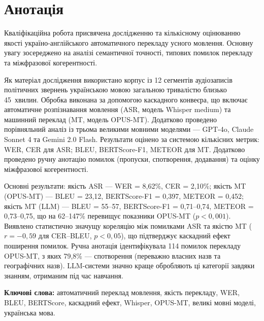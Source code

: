 \setcounter{secnumdepth}{0}
\section{\centering Анотація}

Кваліфікаційна робота присвячена дослідженню та кількісному оцінюванню якості
україно-англійського автоматичного перекладу усного мовлення. Основну увагу
зосереджено на аналізі семантичної точності, типових помилок перекладу та
міжфразової когерентності.

Як матеріал дослідження використано корпус із 12 сегментів аудіозаписів
політичних звернень українською мовою загальною тривалістю близько 45~хвилин.
Обробка виконана за допомогою каскадного конвеєра, що включає автоматичне
розпізнавання мовлення (ASR, модель Whisper medium) та машинний переклад
(MT, модель OPUS-MT). Додатково проведено порівняльний аналіз із трьома
великими мовними моделями --- GPT-4o, Claude Sonnet 4 та Gemini 2.0 Flash.
Результати оцінено за системою кількісних метрик: WER, CER для ASR; BLEU,
BERTScore-F1, METEOR для MT. Додатково проведено ручну анотацію помилок
(пропуски, спотворення, додавання) та оцінку міжфразової когерентності.

Основні результати: якість ASR --- WER = 8,62\%, CER = 2,10\%; якість MT
(OPUS-MT) --- BLEU = 23,12, BERTScore-F1 = 0,397, METEOR = 0,452; якість MT
(LLM) --- BLEU = 55--57, BERTScore-F1 = 0,71--0,74, METEOR = 0,73--0,75, що
на 62--147\% перевищує показники OPUS-MT ($p < 0,001$). Виявлено статистично
значущу кореляцію між помилками ASR та якістю MT ($r = -0,59$ для CER--BLEU,
$p < 0,05$), що підтверджує каскадний ефект поширення помилок. Ручна анотація
ідентифікувала 114 помилок перекладу OPUS-MT, з яких 79,8\% --- спотворення
(переважно власних назв та географічних назв). LLM-системи значно краще обробляють ці категорії завдяки знанням,
отриманим під час навчання.

\textbf{Ключові слова:} автоматичний переклад мовлення, якість перекладу,
WER, BLEU, BERTScore, каскадний ефект, Whisper, OPUS-MT, великі мовні моделі,
українська мова.
